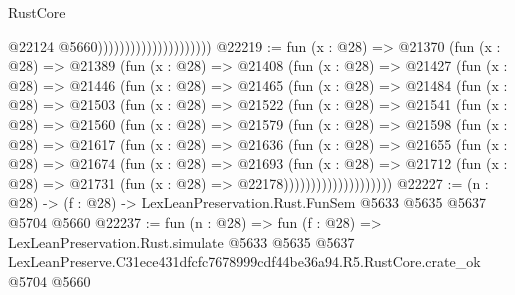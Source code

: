 \begin{lexlean}{RustCore}
\begin{coremodule}
                                              @22124
                                              @5660)))))))))))))))))))))
@22219 := fun (x : @28) =>
  @21370
    (fun (x : @28) =>
    @21389
      (fun (x : @28) =>
      @21408
        (fun (x : @28) =>
        @21427
          (fun (x : @28) =>
          @21446
            (fun (x : @28) =>
            @21465
              (fun (x : @28) =>
              @21484
                (fun (x : @28) =>
                @21503
                  (fun (x : @28) =>
                  @21522
                    (fun (x : @28) =>
                    @21541
                      (fun (x : @28) =>
                      @21560
                        (fun (x : @28) =>
                        @21579
                          (fun (x : @28) =>
                          @21598
                            (fun (x : @28) =>
                            @21617
                              (fun (x : @28) =>
                              @21636
                                (fun (x : @28) =>
                                @21655
                                  (fun (x : @28) =>
                                  @21674
                                    (fun (x : @28) =>
                                    @21693
                                      (fun (x : @28) =>
                                      @21712
                                        (fun (x : @28) =>
                                        @21731 (fun (x : @28) => @22178))))))))))))))))))))
@22227 := (n : @28) -> (f : @28) -> LexLeanPreservation.Rust.FunSem @5633 @5635 @5637 @5704 @5660
@22237 := fun (n : @28) =>
  fun (f : @28) =>
  LexLeanPreservation.Rust.simulate
    @5633
    @5635
    @5637
    LexLeanPreserve.C31ece431dfcfc7678999cdf44be36a94.R5.RustCore.crate_ok
    @5704
    @5660
\end{coremodule}
\end{lexlean}
